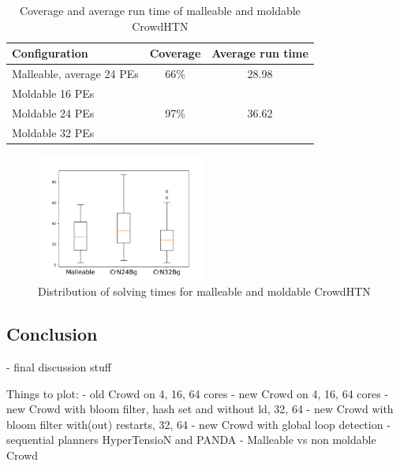 \begin{table}
	\caption{Coverage and average run time of malleable and moldable CrowdHTN}
	\label{table: malleability}
	\centering
	
	\begin{tabular}{|l|c|c|}
		\hline
		Configuration & Coverage & Average run time \\
		\hline
		Malleable, average 24 PEs	& 66\%	& 28.98 \\
		Moldable 16 PEs				& & \\
		Moldable 24 PEs				& 97\% & 36.62 \\
		Moldable 32 PEs				& & \\
		\hline
	\end{tabular}
\end{table}
\begin{figure}
	\caption{Distribution of solving times for malleable and moldable CrowdHTN}
	\label{figure: malleability}
	\centering
	\includegraphics[width=0.5\textwidth]{images/final/malleability}
\end{figure}

\subsection{Conclusion}
\label{eval: conclusion}
- final discussion stuff

Things to plot:
- old Crowd on 4, 16, 64 cores
- new Crowd on 4, 16, 64 cores
- new Crowd with bloom filter, hash set and without ld, 32, 64
- new Crowd with bloom filter with(out) restarts, 32, 64
- new Crowd with global loop detection
- sequential planners HyperTensioN and PANDA
- Malleable vs non moldable Crowd

